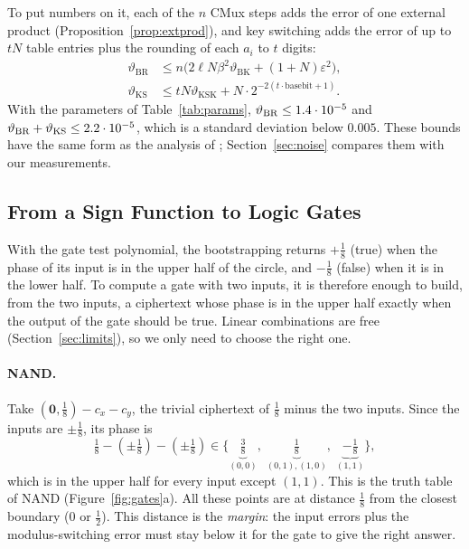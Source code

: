 \documentclass[12pt]{article}
\theoremstyle{plain}
\theoremstyle{definition}
\newcommand{\BK}{\mathrm{BK}}
\newcommand{\KSK}{\mathrm{KSK}}
\begin{document}
To put numbers on it, each of the $n$ CMux steps adds the error of one external
product (Proposition~\ref{prop:extprod}), and key switching adds the error of up
to $tN$ table entries plus the rounding of each $a_i$ to $t$ digits:
\begin{align}
  \vartheta_{\mathrm{BR}}&\le n\big(2\ell N\beta^2\vartheta_{\BK}+(1+N)\varepsilon^2\big),
  \label{eq:varbr}\\
  \vartheta_{\mathrm{KS}}&\le tN\vartheta_{\KSK}+N\cdot2^{-2(t\cdot\mathrm{basebit}+1)}.
  \label{eq:varks}
\end{align}
With the parameters of Table~\ref{tab:params}, $\vartheta_{\mathrm{BR}}\le
1.4\cdot10^{-5}$ and $\vartheta_{\mathrm{BR}}+\vartheta_{\mathrm{KS}}\le2.2\cdot10^{-5}$,
which is a standard deviation below $0.005$. These bounds have the same form as
the analysis of \cite{chillotti2020tfhe}; Section~\ref{sec:noise} compares them
with our measurements.

\subsection{From a Sign Function to Logic Gates}
\label{sec:gates}

With the gate test polynomial, the bootstrapping returns $+\frac18$
(\textsf{true}) when the phase of its input is in the upper half of the circle,
and $-\frac18$ (\textsf{false}) when it is in the lower half. To compute a gate
with two inputs, it is therefore enough to build, from the two inputs, a
ciphertext whose phase is in the upper half exactly when the output of the
gate should be \textsf{true}. Linear combinations are free
(Section~\ref{sec:limits}), so we only need to choose the right one.

\paragraph{NAND.}
Take $(\mathbf{0},\frac18)-c_x-c_y$, the trivial ciphertext of $\frac18$ minus
the two inputs. Since the inputs are $\pm\frac18$, its phase is
\[
  \tfrac18-(\pm\tfrac18)-(\pm\tfrac18)\in
  \big\{\underbrace{\tfrac38}_{(0,0)},\;
        \underbrace{\tfrac18}_{(0,1),(1,0)},\;
        \underbrace{-\tfrac18}_{(1,1)}\big\},
\]
which is in the upper half for every input except $(1,1)$. This is the truth
table of NAND (Figure~\ref{fig:gates}a). All these points are at distance
$\frac18$ from the closest boundary ($0$ or $\frac12$). This distance is the
\emph{margin}: the input errors plus the modulus-switching error must stay
below it for the gate to give the right answer.
\end{document}
